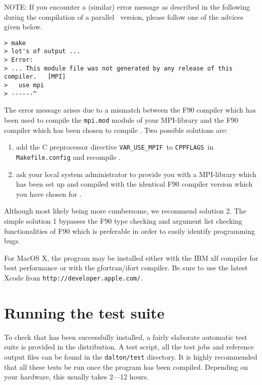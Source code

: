 NOTE: If you encounter a (similar) error message as described in the following during the 
compilation of a parallel \dalton\ version, please follow one of the advices given below. 
\begin{verbatim}
> make
> lot's of output ...
> Error:
> ... This module file was not generated by any release of this compiler.   [MPI]
>   use mpi
> ------^
\end{verbatim}
The error message arises due to a mismatch between the F90 compiler which 
has been used to compile the \verb|mpi.mod| module of your MPI-library 
and the F90 compiler which has been chosen to compile \dalton. 
Two possible solutions are:
\begin{enumerate}
\item add the C preprocessor directive \verb|VAR_USE_MPIF|\ to \verb|CPPFLAGS|\ in \verb|Makefile.config| 
and recompile \dalton.
\item ask your local system administrator to provide you with a MPI-library which has been 
set up and compiled with the identical F90 compiler version which you have chosen for \dalton.
\end{enumerate}
Although most likely being more cumbersome, we recommend solution 2. The simple solution 1 bypasses the 
F90 type checking and argument list checking functionalities of F90 which is preferable in order to 
easily identify programming bugs.

For MacOS X, the program may be installed either with the IBM
xlf compiler for best performance or with the gfortran/ifort compiler. Be sure
to use the latest Xcode from \verb|http://developer.apple.com/|.

\section{Running the {\dalton} test suite}\label{sec:testsuite}

To check that {\dalton} has been successfully installed, a fairly
elaborate automatic test suite is provided in the distribution. A test
script, all the test jobs and reference output files can be found in
the \verb|dalton/test| directory. It is highly recommended that all
these tests be run once the program has been compiled. Depending on
your hardware, this usually takes 2---12 hours.

